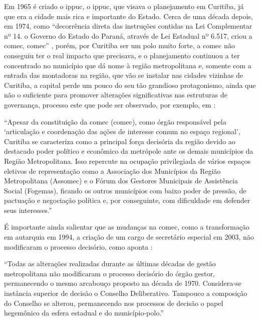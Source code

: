 	Em 1965 é criado o \glsdesc{ippuc}, o \gls{ippuc}, que  visava o planejamento em Curitiba, já que era a cidade mais rica e importante do Estado. Cerca de uma década depois, em 1974, como ``decorrência direta das instruções contidas na Lei Complementar nº 14. o Governo do Estado do Paraná, através de Lei Estadual nº 6.517, criou a \glsdesc{comec}, \gls{comec}'' \cite{comec2019b}, porém, por Curitiba ser um polo muito forte, a \gls{comec} não conseguiu ter o real impacto que precisava, e o planejamento continuou a ter concentrado no município que dá nome à região metropolitana e, somente com a entrada das montadoras na região, que vão se instalar nas cidades vizinhas de Curitiba, a capital perde um pouco do seu tão grandioso protagonismo, ainda que não o suficiente para promover alterações significativas nas estruturas de governança, processo este que pode ser observado, por exemplo, em :

	\begin{citacao}
		``Apesar da constituição da \glsdesc{comec} (\gls{comec}), como órgão responsável pela `articulação e coordenação das ações de interesse comum no espaço regional', Curitiba se caracteriza como a principal força decisória da região devido ao destacado poder político e econômico da metrópole ante os demais municípios da Região Metropolitana. Isso repercute na ocupação privilegiada de vários espaços eletivos de representação como a Associação dos	Municípios da Região Metropolitana (Assomec) e o Fórum dos Gestores Municipais	de Assistência Social (Fogemas), ficando os outros municípios com baixo poder de pressão, de pactuação e negociação política e, por conseguinte, com dificuldade	em defender seus interesses.'' \cite[p. 84]{colin2009a}
	\end{citacao}

	É importante ainda salientar que as mudanças na \gls{comec}, como a transformação em autarquia em 1994, a criação de um cargo de secretário especial em 2003, não modificaram o processo decisório, como aponta \cite[p. 21]{costa2015b}:
	
	\begin{citacao}
		``Todas as alterações realizadas durante as últimas décadas de gestão metropolitana não modificaram o processo decisório do órgão gestor, permanecendo o mesmo arcabouço proposto na década de 1970. Considera-se instância superior de decisão o Conselho Deliberativo. Tampouco a composição do Conselho se alterou, permanecendo nos processos de decisão o papel hegemônico da esfera estadual e do município-polo.''
	\end{citacao}
	
